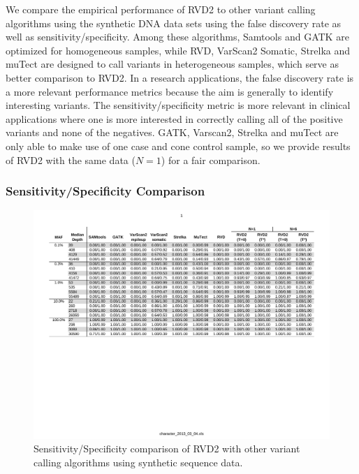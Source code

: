 \documentclass{bioinfo}
\begin{document}
We compare the empirical performance of RVD2 to other variant calling algorithms using the synthetic DNA data sets using the false discovery rate as well as sensitivity/specificity. Among these algorithms, Samtools and GATK are optimized for homogeneous samples, while RVD, VarScan2 Somatic, Strelka and muTect are designed to call variants in heterogeneous samples, which serve as better comparison to RVD2. In a research applications, the false discovery rate is a more relevant performance metrics because the aim is generally to identify interesting variants. The sensitivity/specificity metric is more relevant in clinical applications where one is more interested in correctly calling all of the positive variants and none of the negatives. GATK, Varscan2, Strelka and muTect are only able to make use of one case and cone control sample, so we provide results of RVD2 with the same data ($N=1$) for a fair comparison.




\subsubsection*{Sensitivity/Specificity Comparison}
\begin{figure}[!htpb]
\begin{center}
\includegraphics[width=1\textwidth]{pdf_figs/comparison_table_ss.pdf}
\caption{Sensitivity/Specificity comparison of RVD2 with other variant calling algorithms using synthetic sequence data.}
\label{tbl:comparison_ss}
\end{center}
\end{figure}
\end{document}
